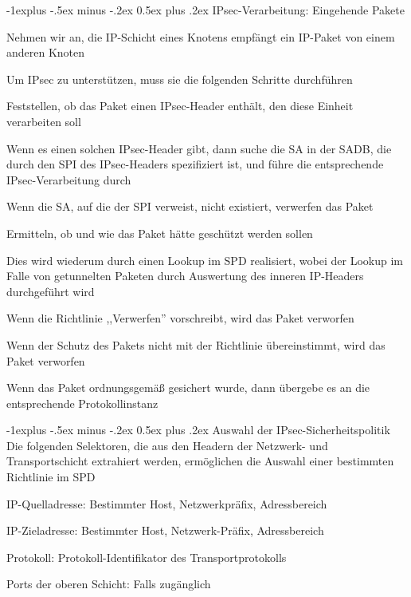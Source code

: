 \documentclass[a4paper]{article}
\makeatletter
\renewcommand{\subsection}{\@startsection{subsection}{2}{0mm}%
 {-1explus -.5ex minus -.2ex}%
 {0.5ex plus .2ex}%
 {\normalfont\normalsize\bfseries}}
\makeatother
\begin{document}
\begin{multicols}{3}
      \subsection{IPsec-Verarbeitung: Eingehende Pakete}
      \begin{itemize*}
            \item Nehmen wir an, die IP-Schicht eines Knotens empfängt ein IP-Paket von einem anderen Knoten
            \item Um IPsec zu unterstützen, muss sie die folgenden Schritte durchführen
            \item Feststellen, ob das Paket einen IPsec-Header enthält, den diese Einheit verarbeiten soll
            \begin{itemize*}
                  \item Wenn es einen solchen IPsec-Header gibt, dann suche die SA in der SADB, die durch den SPI des IPsec-Headers spezifiziert ist, und führe die entsprechende IPsec-Verarbeitung durch
                  \item Wenn die SA, auf die der SPI verweist, nicht existiert, verwerfen das Paket
            \end{itemize*}
            \item Ermitteln, ob und wie das Paket hätte geschützt werden sollen
            \begin{itemize*}
                  \item Dies wird wiederum durch einen Lookup im SPD realisiert, wobei der Lookup im Falle von getunnelten Paketen durch Auswertung des inneren IP-Headers durchgeführt wird
                  \item Wenn die Richtlinie ,,Verwerfen'' vorschreibt, wird das Paket verworfen
                  \item Wenn der Schutz des Pakets nicht mit der Richtlinie übereinstimmt, wird das Paket verworfen
                  \item Wenn das Paket ordnungsgemäß gesichert wurde, dann übergebe es an die entsprechende Protokollinstanz
            \end{itemize*}
      \end{itemize*}

      \subsection{Auswahl der IPsec-Sicherheitspolitik}
      Die folgenden Selektoren, die aus den Headern der Netzwerk- und Transportschicht extrahiert werden, ermöglichen die Auswahl einer bestimmten Richtlinie im SPD
      \begin{itemize*}
            \item IP-Quelladresse: Bestimmter Host, Netzwerkpräfix, Adressbereich
            \item IP-Zieladresse: Bestimmter Host, Netzwerk-Präfix, Adressbereich
            \item Protokoll: Protokoll-Identifikator des Transportprotokolls
            \item Ports der oberen Schicht: Falls zugänglich %
      \end{itemize*}


\end{multicols}
\end{document}
